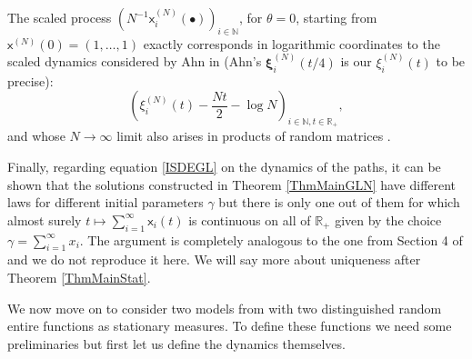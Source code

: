 \documentclass[]{article}
\begin{document}
The scaled process $(N^{-1}\mathsf{x}_i^{(N)}(\bullet))_{i\in \mathbb{N}}$, for $\theta=0$, starting from $\mathsf{x}^{(N)}(0)=(1,\dots,1)$ exactly corresponds in logarithmic coordinates to the scaled dynamics considered by Ahn in \cite{Ahn} (Ahn's $\boldsymbol{\xi}_i^{(N)}(t/4)$ is our $\xi_i^{(N)}(t)$ to be precise):
\begin{equation}\label{AhnRescaledProcess}
\left(\xi_i^{(N)}\left(t\right)-\frac{Nt}{2}-\log N\right)_{i\in \mathbb{N},t\in \mathbb{R}_+},
\end{equation}
and whose $N \to \infty $ limit also arises in products of random matrices \cite{Ahn,LiuWangWang,Akemann2019integrable,AkemannUniversality}. 

Finally, regarding equation \eqref{ISDEGL} on the dynamics of the paths, it can be shown that the solutions
constructed in Theorem \ref{ThmMainGLN} have different laws for different initial parameters $\gamma$ but there is only one out of them for which almost surely $t\mapsto \sum_{i=1}^\infty \mathsf{x}_i(t)$ is continuous on all of $\mathbb{R}_+$ given by  the choice $\gamma=\sum_{i=1}^\infty x_i$. The argument is completely analogous to the one from Section 4 of \cite{AM24} and we do not reproduce it here. We will say more about uniqueness after Theorem \ref{ThmMainStat}.

We now move on to consider two models from \cite{AM24,HuaPickrellDiffusions} with two distinguished random entire functions \cite{ChhaibiNajnudelNikeghbali,ValkoVirag2,LiValko,Theo-RandomEntireFunctions} as stationary measures. To define these functions we need some preliminaries but first let us define the dynamics themselves. 
\end{document}
